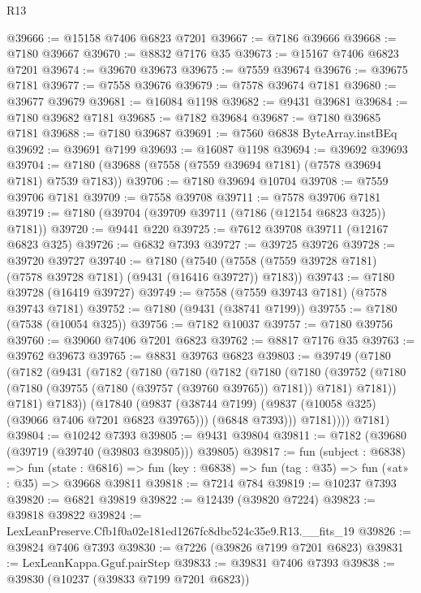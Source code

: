 \begin{lexlean}{R13}
\begin{coremodule}
@39666 := @15158 @7406 @6823 @7201
@39667 := @7186 @39666
@39668 := @7180 @39667
@39670 := @8832 @7176 @35
@39673 := @15167 @7406 @6823 @7201
@39674 := @39670 @39673
@39675 := @7559 @39674
@39676 := @39675 @7181
@39677 := @7558 @39676
@39679 := @7578 @39674 @7181
@39680 := @39677 @39679
@39681 := @16084 @1198
@39682 := @9431 @39681
@39684 := @7180 @39682 @7181
@39685 := @7182 @39684
@39687 := @7180 @39685 @7181
@39688 := @7180 @39687
@39691 := @7560 @6838 ByteArray.instBEq
@39692 := @39691 @7199
@39693 := @16087 @1198
@39694 := @39692 @39693
@39704 := @7180 (@39688 (@7558 (@7559 @39694 @7181) (@7578 @39694 @7181) @7539 @7183))
@39706 := @7180 @39694 @10704
@39708 := @7559 @39706 @7181
@39709 := @7558 @39708
@39711 := @7578 @39706 @7181
@39719 := @7180 (@39704 (@39709 @39711 (@7186 (@12154 @6823 @325)) @7181))
@39720 := @9441 @220
@39725 := @7612 @39708 @39711 (@12167 @6823 @325)
@39726 := @6832 @7393
@39727 := @39725 @39726
@39728 := @39720 @39727
@39740 := @7180
    (@7540 (@7558 (@7559 @39728 @7181) (@7578 @39728 @7181) (@9431 (@16416 @39727)) @7183))
@39743 := @7180 @39728 (@16419 @39727)
@39749 := @7558 (@7559 @39743 @7181) (@7578 @39743 @7181)
@39752 := @7180 (@9431 (@38741 @7199))
@39755 := @7180 (@7538 (@10054 @325))
@39756 := @7182 @10037
@39757 := @7180 @39756
@39760 := @39060 @7406 @7201 @6823
@39762 := @8817 @7176 @35
@39763 := @39762 @39673
@39765 := @8831 @39763 @6823
@39803 := @39749
    (@7180
      (@7182
        (@9431
          (@7182
            (@7180
              (@7180
                (@7182
                  (@7180
                    (@7180
                      (@39752
                        (@7180 (@7180 (@39755 (@7180 (@39757 (@39760 @39765)) @7181)) @7181) @7181))
                      @7181)
                    @7183))
                (@17840
                  (@9837 (@38744 @7199) (@9837 (@10058 @325) (@39066 @7406 @7201 @6823 @39765)))
                  (@6848 @7393)))
              @7181))))
      @7181)
@39804 := @10242 @7393
@39805 := @9431 @39804
@39811 := @7182 (@39680 (@39719 (@39740 (@39803 @39805))) @39805)
@39817 := fun (subject : @6838) =>
  fun (state : @6816) => fun (key : @6838) => fun (tag : @35) => fun («at» : @35) => @39668 @39811
@39818 := @7214 @784
@39819 := @10237 @7393
@39820 := @6821 @39819
@39822 := @12439 (@39820 @7224)
@39823 := @39818 @39822
@39824 := LexLeanPreserve.Cfb1f0a02e181ed1267fc8dbc524c35e9.R13.__fits_19
@39826 := @39824 @7406 @7393
@39830 := @7226 (@39826 @7199 @7201 @6823)
@39831 := LexLeanKappa.Gguf.pairStep
@39833 := @39831 @7406 @7393
@39838 := @39830 (@10237 (@39833 @7199 @7201 @6823))

\end{coremodule}
\end{lexlean}
